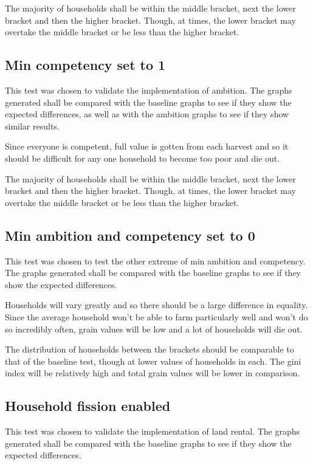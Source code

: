 \documentclass[12pt]{article}
\begin{document}
				The majority of households shall be within the middle bracket, next the lower bracket and then the higher bracket. Though, at times, the lower bracket may overtake the middle bracket or be less than the higher bracket.
		
		
			\subsection{Min competency set to 1}
				This test was chosen to validate the implementation of ambition. The graphs generated shall be compared with the baseline graphs to see if they show the expected differences, as well as with the ambition graphs to see if they show similar results.
		
				Since everyone is competent, full value is gotten from each harvest and so it should be difficult for any one household to become too poor and die out.
		
				The majority of households shall be within the middle bracket, next the lower bracket and then the higher bracket. Though, at times, the lower bracket may overtake the middle bracket or be less than the higher bracket.
		
		
		
			\subsection{Min ambition and competency set to 0}
				This test was chosen to test the other extreme of min ambition and competency. The graphs generated shall be compared with the baseline graphs to see if they show the expected differences.
				
				Households will vary greatly and so there should be a large difference in equality. Since the average household won’t be able to farm particularly well and won’t do so incredibly often, grain values will be low and a lot of households will die out.
				
				The distribution of households between the brackets should be comparable to that of the baseline test, though at lower values of households in each. The gini index will be relatively high and total grain values will be lower in comparison.
		
			\subsection{Household fission enabled}
				This test was chosen to validate the implementation of land rental. The graphs generated shall be compared with the baseline graphs to see if they show the expected differences.
			
\end{document}
